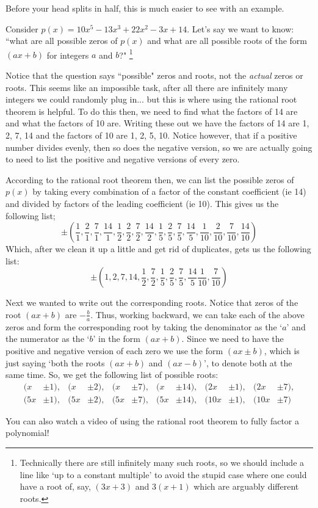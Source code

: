 \documentclass{ximeraXloud}
\begin{document}
    Before your head splits in half, this is much easier to see with an example.
    
    Consider $p(x) = 10x^5 - 13x^3 + 22x^2 - 3x + 14$. Let's say we want to know: ``what are all possible zeros of $p(x)$ and what are all possible roots of the form $(ax + b)$ for integers $a$ and $b$?"%
        \footnote{Technically there are still infinitely many such roots, so we should include a line like `up to a constant multiple' to avoid the stupid case where one could have a root of, say, $(3x + 3)$ and $3(x + 1)$ which are arguably different roots.}
    
        Notice that the question says ``possible" zeros and roots, not the \textit{actual} zeros or roots. This seems like an impossible task, after all there are infinitely many integers we could randomly plug in... but this is where using the rational root theorem is helpful. To do this then, we need to find what the factors of 14 are and what the factors of 10 are. Writing these out we have the factors of 14 are 1, 2, 7, 14 and the factors of 10 are 1, 2, 5, 10. Notice however, that if a positive number divides evenly, then so does the negative version, so we are actually going to need to list the positive and negative versions of every zero.
    
        According to the rational root theorem then, we can list the possible zeros of $p(x)$ by taking every combination of a factor of the constant coefficient (ie 14) and divided by factors of the leading coefficient (ie 10). This gives us the following list;
        \[
            \pm \left(\frac{1}{1}, \frac{2}{1}, \frac{7}{1}, \frac{14}{1},
            \frac{1}{2}, \frac{2}{2}, \frac{7}{2}, \frac{14}{2},
            \frac{1}{5}, \frac{2}{5}, \frac{7}{5}, \frac{14}{5},
            \frac{1}{10}, \frac{2}{10}, \frac{7}{10}, \frac{14}{10}\right)
        \]
        Which, after we clean it up a little and get rid of duplicates, gets us the following list:
        \[
            \pm \left( 1, 2, 7, 14,
            \frac{1}{2}, \frac{7}{2},
            \frac{1}{5}, \frac{2}{5}, \frac{7}{5}, \frac{14}{5}
            \frac{1}{10}, \frac{7}{10}\right)
        \]
    
        Next we wanted to write out the corresponding roots. Notice that zeros of the root $(ax + b)$ are $-\frac{b}{a}$. Thus, working backward, we can take each of the above zeros and form the corresponding root by taking the denominator as the `$a$' and the numerator as the `$b$' in the form $(ax + b)$. Since we need to have the positive and negative version of each zero we use the form $(ax \pm b)$, which is just saying `both the roots $(ax + b)$ and $(ax - b)$', to denote both at the same time.  %
        So, we get the following list of possible roots:
        \begin{align*}
            (x &\pm 1),     &(x &\pm 2),    &(x &\pm 7),    &(x &\pm 14),   &(2x &\pm 1),   &(2x &\pm 7), \\
            (5x &\pm 1),    &(5x &\pm 2),   &(5x &\pm 7),   &(5x &\pm 14),  &(10x &\pm 1),  &(10x &\pm 7)
        \end{align*}

You can also watch a video of using the rational root theorem to fully factor a polynomial!

\end{document}
